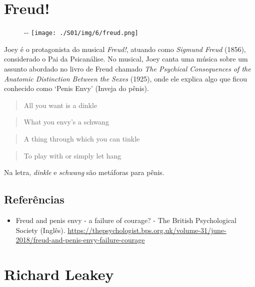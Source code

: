 \hypertarget{freud}{%
\section{Freud!}\label{freud}}

\begin{figure}[!ht]
  \begin{adjustwidth}{-\oddsidemargin-1in}{-\rightmargin}
    \centering
    \texttt{[image: ./S01/img/6/freud.png]}
  \end{adjustwidth}
\end{figure}

Joey é o protagonista do musical \emph{Freud!}, atuando como
\emph{Sigmund Freud} (1856), considerado o Pai da Psicanálise. No
musical, Joey canta uma música sobre um assunto abordado no livro de
Freud chamado \emph{The Psychical Consequences of the Anatomic
Distinction Between the Sexes} (1925), onde ele explica algo que ficou
conhecido como `Penis Envy' (Inveja do pênis).

\begin{quote}
All you want is a dinkle
\end{quote}

\begin{quote}
What you envy's a schwang
\end{quote}

\begin{quote}
A thing through which you can tinkle
\end{quote}

\begin{quote}
To play with or simply let hang
\end{quote}

Na letra, \emph{dinkle} e \emph{schwang} são metáforas para pênis.

\hypertarget{referuxeancias}{%
\subsection{Referências}\label{referuxeancias}}

\begin{itemize}
\tightlist
\item
  \sloppy Freud and penis envy - a failure of courage? - The British Psychological Society (Inglês). \url{https://thepsychologist.bps.org.uk/volume-31/june-2018/freud-and-penis-envy-failure-courage}
\end{itemize}

\hypertarget{richard-leakey}{%
\section{Richard Leakey}\label{richard-leakey}}

